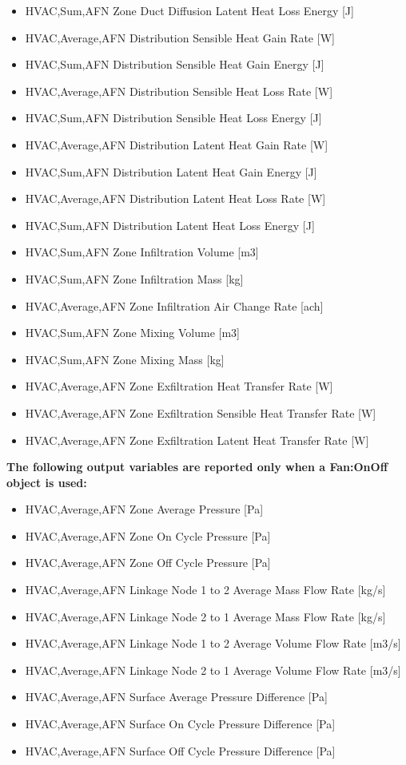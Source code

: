\begin{itemize}
\item
  HVAC,Sum,AFN Zone Duct Diffusion Latent Heat Loss Energy {[}J{]}
\item
  HVAC,Average,AFN Distribution Sensible Heat Gain Rate {[}W{]}
\item
  HVAC,Sum,AFN Distribution Sensible Heat Gain Energy {[}J{]}
\item
  HVAC,Average,AFN Distribution Sensible Heat Loss Rate {[}W{]}
\item
  HVAC,Sum,AFN Distribution Sensible Heat Loss Energy {[}J{]}
\item
  HVAC,Average,AFN Distribution Latent Heat Gain Rate {[}W{]}
\item
  HVAC,Sum,AFN Distribution Latent Heat Gain Energy {[}J{]}
\item
  HVAC,Average,AFN Distribution Latent Heat Loss Rate {[}W{]}
\item
  HVAC,Sum,AFN Distribution Latent Heat Loss Energy {[}J{]}
\item
  HVAC,Sum,AFN Zone Infiltration Volume {[}m3{]}
\item
  HVAC,Sum,AFN Zone Infiltration Mass {[}kg{]}
\item
  HVAC,Average,AFN Zone Infiltration Air Change Rate {[}ach{]}
\item
  HVAC,Sum,AFN Zone Mixing Volume {[}m3{]}
\item
  HVAC,Sum,AFN Zone Mixing Mass {[}kg{]}
\item
  HVAC,Average,AFN Zone Exfiltration Heat Transfer Rate {[}W{]}
\item
  HVAC,Average,AFN Zone Exfiltration Sensible Heat Transfer Rate {[}W{]}
\item
  HVAC,Average,AFN Zone Exfiltration Latent Heat Transfer Rate {[}W{]}
\end{itemize}

\textbf{The following output variables are reported only when a Fan:OnOff object is used:}

\begin{itemize}
\item
  HVAC,Average,AFN Zone Average Pressure {[}Pa{]}
\item
  HVAC,Average,AFN Zone On Cycle Pressure {[}Pa{]}
\item
  HVAC,Average,AFN Zone Off Cycle Pressure {[}Pa{]}
\item
  HVAC,Average,AFN Linkage Node 1 to 2 Average Mass Flow Rate {[}kg/s{]}
\item
  HVAC,Average,AFN Linkage Node 2 to 1 Average Mass Flow Rate {[}kg/s{]}
\item
  HVAC,Average,AFN Linkage Node 1 to 2 Average Volume Flow Rate {[}m3/s{]}
\item
  HVAC,Average,AFN Linkage Node 2 to 1 Average Volume Flow Rate {[}m3/s{]}
\item
  HVAC,Average,AFN Surface Average Pressure Difference {[}Pa{]}
\item
  HVAC,Average,AFN Surface On Cycle Pressure Difference {[}Pa{]}
\item
  HVAC,Average,AFN Surface Off Cycle Pressure Difference {[}Pa{]}
\end{itemize}


